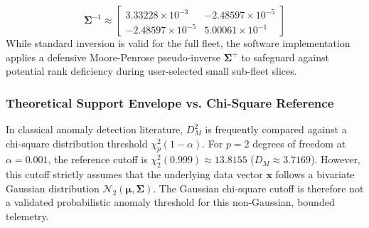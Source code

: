 \documentclass[journal]{IEEEtran}
\begin{document}
\begin{equation}
\mathbf{\Sigma}^{-1} \approx \begin{bmatrix} 3.33228 \times 10^{-3} & -2.48597 \times 10^{-5} \\ -2.48597 \times 10^{-5} & 5.00061 \times 10^{-1} \end{bmatrix}
\end{equation}
While standard inversion is valid for the full fleet, the software implementation applies a defensive Moore-Penrose pseudo-inverse $\mathbf{\Sigma}^+$ to safeguard against potential rank deficiency during user-selected small sub-fleet slices.

\subsubsection{Theoretical Support Envelope vs. Chi-Square Reference}
In classical anomaly detection literature, $D_M^2$ is frequently compared against a chi-square distribution threshold $\chi_p^2(1-\alpha)$. For $p = 2$ degrees of freedom at $\alpha = 0.001$, the reference cutoff is $\chi_2^2(0.999) \approx 13.8155$ ($D_M \approx 3.7169$). However, this cutoff strictly assumes that the underlying data vector $\mathbf{x}$ follows a bivariate Gaussian distribution $\mathcal{N}_2(\boldsymbol{\mu}, \mathbf{\Sigma})$. The Gaussian chi-square cutoff is therefore not a validated probabilistic anomaly threshold for this non-Gaussian, bounded telemetry.
\end{document}
